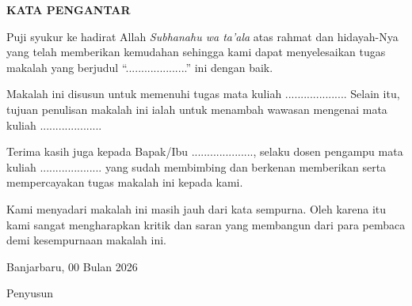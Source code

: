 \begin{center}
	\textbf{KATA PENGANTAR}
\end{center}


\setlength{\parindent}{1cm}

Puji syukur ke hadirat Allah \textit{Subhanahu wa ta'ala} atas rahmat dan hidayah-Nya yang telah memberikan kemudahan sehingga kami dapat menyelesaikan tugas makalah yang berjudul ``....................'' ini dengan baik.

Makalah ini disusun untuk memenuhi tugas mata kuliah .................... Selain itu, tujuan penulisan makalah ini ialah untuk menambah wawasan mengenai mata kuliah ....................

Terima kasih juga kepada Bapak/Ibu ...................., selaku dosen pengampu mata kuliah .................... yang sudah membimbing dan berkenan memberikan serta mempercayakan tugas makalah ini kepada kami.

Kami menyadari makalah ini masih jauh dari kata sempurna. Oleh karena itu kami sangat mengharapkan kritik dan saran yang membangun dari para pembaca demi kesempurnaan makalah ini.

\vspace{1.5cm}

\begin{flushright}
	Banjarbaru, 00 Bulan 2026

	\vspace{2cm}

	Penyusun
\end{flushright}

\newpage %

